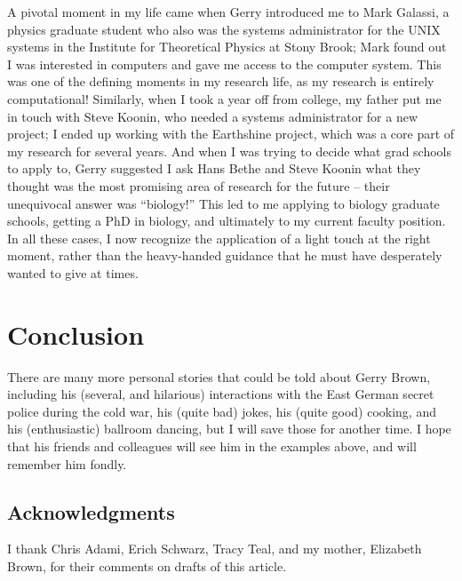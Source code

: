 A pivotal moment in my life came when Gerry introduced me to Mark
Galassi, a physics graduate student who also was the systems
administrator for the UNIX systems in the Institute for Theoretical
Physics at Stony Brook; Mark found out I was interested in computers
and gave me access to the computer system. This was one of the
defining moments in my research life, as my research is entirely
computational!  Similarly, when I took a year off from college, my
father put me in touch with Steve Koonin, who needed a systems
administrator for a new project; I ended up working with the
Earthshine project, which was a core part of my research for several
years. And when I was trying to decide what grad schools to apply to,
Gerry suggested I ask Hans Bethe and Steve Koonin what they thought
was the most promising area of research for the future -- their
unequivocal answer was ``biology!''  This led to me applying to
biology graduate schools, getting a PhD in biology, and ultimately to
my current faculty position. In all these cases, I now recognize the
application of a light touch at the right moment, rather than the
heavy-handed guidance that he must have desperately wanted to give at
times.

\section*{Conclusion}

There are many more personal stories that could be told about Gerry
Brown, including his (several, and hilarious) interactions with the East
German secret police during the cold war, his (quite bad) jokes, his
(quite good) cooking, and his (enthusiastic) ballroom dancing, but I
will save those for another time. I hope that his friends and
colleagues will see him in the examples above, and will remember him
fondly.


\subsection*{Acknowledgments}

I thank Chris Adami, Erich Schwarz, Tracy Teal, and my mother,
Elizabeth Brown, for their comments on drafts of this article.




